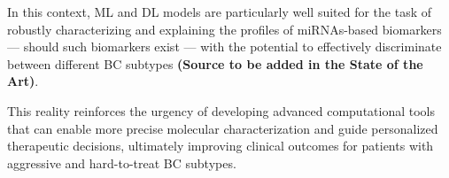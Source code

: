In this context, \gls{ML} and \gls{DL} models are particularly well suited for the task of robustly characterizing and 
explaining the profiles of \gls{miRNAs}-based biomarkers — should such biomarkers exist — with the potential to effectively 
discriminate between different \gls{BC} subtypes \textbf{(Source to be added in the State of the Art)}.

This reality reinforces the urgency of developing advanced computational tools that can enable more precise molecular 
characterization and guide personalized therapeutic decisions, ultimately improving clinical outcomes for patients with 
aggressive and hard-to-treat \gls{BC} subtypes.



\newcommand{\Overleaf}{\href{https://www.overleaf.com?r=f5160636&rm=d&rs=b}{Overleaf}}